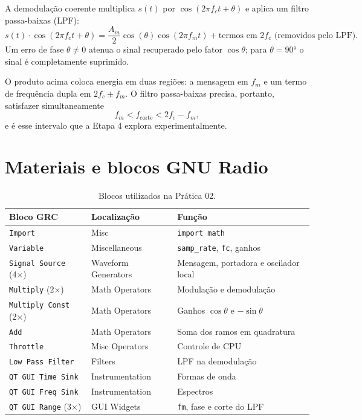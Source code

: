 \documentclass[11pt,a4paper]{article}
\begin{document}
A demodulação coerente multiplica $s(t)$ por $\cos(2\pi f_c t + \theta)$
e aplica um filtro passa-baixas (LPF):
\begin{equation}
  s(t)\cdot\cos(2\pi f_c t + \theta)
  = \frac{A_m}{2}\cos(\theta)\cos(2\pi f_m t)
  + \text{termos em } 2f_c \text{ (removidos pelo LPF)}.
\end{equation}
Um erro de fase $\theta \neq 0$ atenua o sinal recuperado pelo fator
$\cos\theta$; para $\theta = 90°$ o sinal é completamente suprimido.

O produto acima coloca energia em duas regiões: a mensagem em $f_m$ e um
termo de frequência dupla em $2f_c \pm f_m$.  O filtro passa-baixas precisa,
portanto, satisfazer simultaneamente
\begin{equation}
  f_m < f_\text{corte} < 2f_c - f_m,
  \label{eq:criterio-lpf}
\end{equation}
e é esse intervalo que a Etapa 4 explora experimentalmente.

\section{Materiais e blocos GNU Radio}

\begin{table}[H]
  \centering
  \begin{tabular}{l l l}
    \toprule
    \textbf{Bloco GRC} & \textbf{Localização} & \textbf{Função} \\
    \midrule
    \texttt{Import}              & Misc                 & \texttt{import math} \\
    \texttt{Variable}            & Miscellaneous        & \texttt{samp\_rate}, \texttt{fc}, ganhos \\
    \texttt{Signal Source} (4×)  & Waveform Generators  & Mensagem, portadora e oscilador local \\
    \texttt{Multiply} (2×)       & Math Operators       & Modulação e demodulação \\
    \texttt{Multiply Const} (2×) & Math Operators       & Ganhos $\cos\theta$ e $-\sin\theta$ \\
    \texttt{Add}                 & Math Operators       & Soma dos ramos em quadratura \\
    \texttt{Throttle}            & Misc Operators       & Controle de CPU \\
    \texttt{Low Pass Filter}     & Filters              & LPF na demodulação \\
    \texttt{QT GUI Time Sink}    & Instrumentation      & Formas de onda \\
    \texttt{QT GUI Freq Sink}    & Instrumentation      & Espectros \\
    \texttt{QT GUI Range} (3×)   & GUI Widgets          & \texttt{fm}, fase e corte do LPF \\
    \bottomrule
  \end{tabular}
  \caption{Blocos utilizados na Prática 02.}
\end{table}
\end{document}
